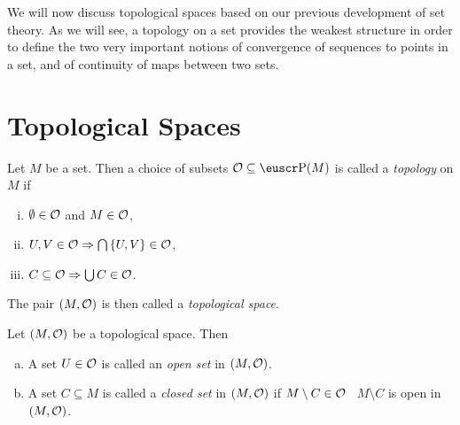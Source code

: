 
We will now discuss topological spaces based on our previous development of set theory. As we will see, a topology on a set provides the weakest structure in order to define the two very important notions of convergence of sequences to points in a set, and of continuity of maps between two sets.

\section{Topological Spaces}

\begin{definition}
	Let \(M\) be a set. Then a choice of subsets \(\CO \subseteq \powerset(M)\) is called a \emph{topology} on \(M\) if
	\begin{enumerate}[(i)]
		\item \(\emptyset \in \mathcal{O}\) and \(M \in \mathcal{O}\),
		\item \(U, V \in \mathcal{O} \Rightarrow \bigcap \qty{U, V} \in \mathcal{O}\),
		\item \(C \subseteq \mathcal{O} \Rightarrow \bigcup C \in \mathcal{O}\).
	\end{enumerate}
	The pair \((M, \mathcal{O})\) is then called a \emph{topological space}.
\end{definition}
\begin{remark}
	Let \((M, \mathcal{O})\) be a topological space. Then
	\begin{enumerate}[(a)]
		\item A set \(U \in \mathcal{O}\) is called an \emph{open set} in \((M, \mathcal{O})\).
		\item A set \(C \subseteq M\) is called a \emph{closed set} in \((M, \mathcal{O})\) if \(M \setminus C \in \mathcal{O}\) \ie\ \(M \setminus C\) is open in \((M, \mathcal{O})\).
	\end{enumerate}
\end{remark}

